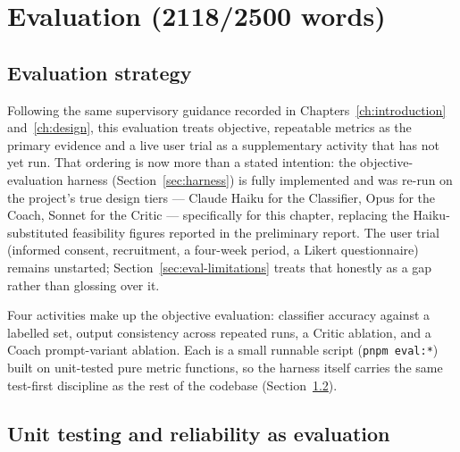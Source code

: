 
\chapter{Evaluation (2118/2500 words)}
\label{ch:evaluation}

\section{Evaluation strategy}

Following the same supervisory guidance recorded in Chapters~\ref{ch:introduction} and~\ref{ch:design}, this evaluation treats objective, repeatable metrics as the primary evidence and a live user trial as a supplementary activity that has not yet run. That ordering is now more than a stated intention: the objective-evaluation harness (Section~\ref{sec:harness}) is fully implemented and was re-run on the project's true design tiers --- Claude Haiku for the Classifier, Opus for the Coach, Sonnet for the Critic --- specifically for this chapter, replacing the Haiku-substituted feasibility figures reported in the preliminary report. The user trial (informed consent, recruitment, a four-week period, a Likert questionnaire) remains unstarted; Section~\ref{sec:eval-limitations} treats that honestly as a gap rather than glossing over it.

Four activities make up the objective evaluation: classifier accuracy against a labelled set, output consistency across repeated runs, a Critic ablation, and a Coach prompt-variant ablation. Each is a small runnable script (\texttt{pnpm eval:*}) built on unit-tested pure metric functions, so the harness itself carries the same test-first discipline as the rest of the codebase (Section~\ref{sec:unit-testing}).

\section{Unit testing and reliability as evaluation}
\label{sec:unit-testing}


